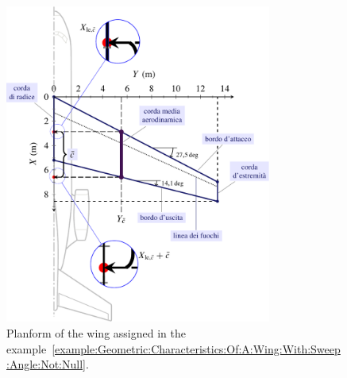 \documentclass[[12pt,twoside]{book}
\begin{document}
\begin{figure}[t]%
\centering
   \includegraphics[width=0.78\textwidth]{Chapter_2/geometric_characteristics_of_a_wing_with_arrow_not_null/wing_planform_basic_1_drawing.pdf}%
  \caption{
            Planform of the wing assigned in the example~\ref{example:Geometric:Characteristics:Of:A:Wing:With:Sweep:Angle:Not:Null}.}
\label{fig:Wing:Planform:Results:A}%
\end{figure}
%

%
\end{document}
